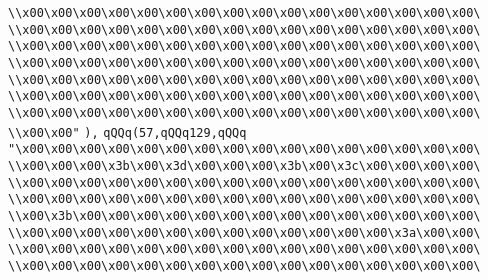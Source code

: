 \verb|\\x00\x00\x00\x00\x00\x00\x00\x00\x00\x00\x00\x00\x00\x00\x00\x00\|\newline
\verb|\\x00\x00\x00\x00\x00\x00\x00\x00\x00\x00\x00\x00\x00\x00\x00\x00\|\newline
\verb|\\x00\x00\x00\x00\x00\x00\x00\x00\x00\x00\x00\x00\x00\x00\x00\x00\|\newline
\verb|\\x00\x00\x00\x00\x00\x00\x00\x00\x00\x00\x00\x00\x00\x00\x00\x00\|\newline
\verb|\\x00\x00\x00\x00\x00\x00\x00\x00\x00\x00\x00\x00\x00\x00\x00\x00\|\newline
\verb|\\x00\x00\x00\x00\x00\x00\x00\x00\x00\x00\x00\x00\x00\x00\x00\x00\|\newline
\verb|\\x00\x00\x00\x00\x00\x00\x00\x00\x00\x00\x00\x00\x00\x00\x00\x00\|\newline
\verb|\\x00\x00"|\newline
\verb|),|\newline
\verb|qQQq(57,qQQq129,qQQq|\newline
\verb|"\x00\x00\x00\x00\x00\x00\x00\x00\x00\x00\x00\x00\x00\x00\x00\x00\|\newline
\verb|\\x00\x00\x00\x3b\x00\x3d\x00\x00\x00\x3b\x00\x3c\x00\x00\x00\x00\|\newline
\verb|\\x00\x00\x00\x00\x00\x00\x00\x00\x00\x00\x00\x00\x00\x00\x00\x00\|\newline
\verb|\\x00\x00\x00\x00\x00\x00\x00\x00\x00\x00\x00\x00\x00\x00\x00\x00\|\newline
\verb|\\x00\x3b\x00\x00\x00\x00\x00\x00\x00\x00\x00\x00\x00\x00\x00\x00\|\newline
\verb|\\x00\x00\x00\x00\x00\x00\x00\x00\x00\x00\x00\x00\x00\x3a\x00\x00\|\newline
\verb|\\x00\x00\x00\x00\x00\x00\x00\x00\x00\x00\x00\x00\x00\x00\x00\x00\|\newline
\verb|\\x00\x00\x00\x00\x00\x00\x00\x00\x00\x00\x00\x00\x00\x00\x00\x00\|\newline
